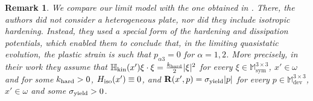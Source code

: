 \documentclass[reqno,10pt]{amsart}
\numberwithin{equation}{section}
\newtheorem{remark}[theorem]{Remark}
\theoremstyle{remark}
\newcommand{\RED}{\color{black}}
\newcommand{\BLACK}{\color{black}}
\newcommand{\PINK}{\color{black}}
\newcommand{\M}{\mathbb{M}}
\DeclareMathOperator{\dev}{dev}
\DeclareMathOperator{\sym}{sym}
\newcommand{\Hkin}{\mathbb{H}_{\rm kin}}
\newcommand{\Hiso}{H_{\rm iso}}
\newcommand{\disspot}{\mathbf{R}}
\begin{document}
\begin{remark} 
\label{remark comparison} 
We compare our limit model with the one obtained in \cite{Liero.Roche.2012}. 
There, the authors did not consider a heterogeneous plate, nor did they include isotropic hardening. 
Instead, they used a special form of the hardening and dissipation potentials, which enabled them to conclude that, in the limiting quasistatic evolution, {\PINK the plastic strain is such that \BLACK}$p_{\alpha 3} = 0$ for $\alpha = 1, 2$. 
More precisely, {\PINK in their work\BLACK} they assume that $\Hkin(x') \xi \cdot \xi=\frac{k_{\rm hard}}{2} |\xi|^2$ for every $\xi \in \M^{3 \times 3}_{\sym}${\RED,\BLACK} $x' \in \omega$ {\RED and\BLACK} for some $k_{\rm hard}>0$, $\Hiso(x') \equiv 0${\RED,\BLACK} and $\disspot(x',p)=\sigma_{\rm yield} |p|$ for every $p \in \M^{3 \times 3}_{\dev}$, $x' \in \omega$ and some $\sigma_{\rm yield}>0$.
\end{remark}
\end{document}
